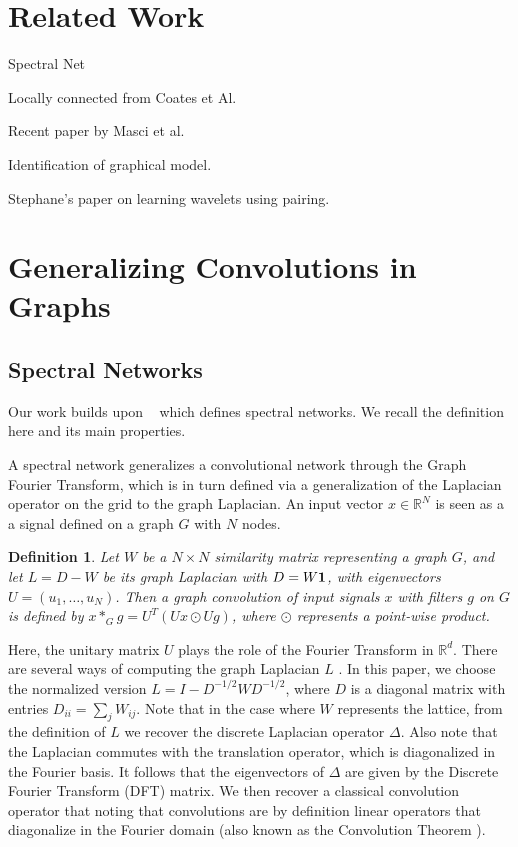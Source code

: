 \documentclass{article} %
\newtheorem{graphconv}{Definition}
\begin{document}


\section{Related Work}

Spectral Net

Locally connected from Coates et Al. 

Recent paper by Masci et al.

Identification of graphical model.

Stephane's paper on learning wavelets using pairing.

\section{Generalizing Convolutions in Graphs }

\subsection{Spectral Networks}

Our work builds upon ~\cite{spectralnet2013} which defines spectral networks. We recall the definition here and its main properties.

A spectral network generalizes a convolutional network through the Graph Fourier Transform, which is in turn defined via a generalization of the Laplacian operator on the grid to the graph Laplacian. An input vector $x \in \mathbb{R}^N$ is seen as a a signal defined on a graph $G$ with $N$ nodes. 
\begin{graphconv}
 Let $W$ be a $N \times N$ similarity matrix representing a graph $G$, and let $L= D - W$ be its graph Laplacian with $D=W {\bf 1}$, with eigenvectors $U=(u_1,\dots,u_N)$. Then a \textit{graph convolution} of input signals $x$ with filters $g$ on $G$ is defined by $x \ast_G g = U^T \left( Ux \odot Ug \right)$, where $\odot$ represents a point-wise product. 
\end{graphconv}

Here, the unitary matrix $U$ plays the role of the Fourier Transform in $\mathbb{R}^d$. 
There are several ways of computing the graph Laplacian $L$ \cite{spectralgraphcite}. In this paper, we choose the normalized version $L = I - D^{-1/2}WD^{-1/2}$, where $D$ is a diagonal matrix with entries $D_{ii} = \sum_j W_{ij}$. Note that in the case where $W$ represents the lattice, from the definition of $L$ we recover the discrete Laplacian operator $\Delta$. Also note that the Laplacian commutes with the translation operator, which is diagonalized in the Fourier basis. 
It follows that the eigenvectors of $\Delta$ are given by the Discrete Fourier Transform (DFT) matrix. 
We then recover a classical convolution operator that noting that convolutions are by definition linear operators that diagonalize in the Fourier domain (also known as the Convolution Theorem \cite{mallat}).
\end{document}
